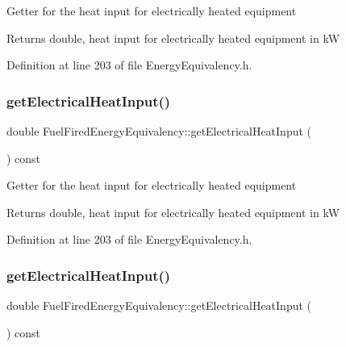 Getter for the heat input for electrically heated equipment

\begin{DoxyReturn}{Returns}
double, heat input for electrically heated equipment in kW 
\end{DoxyReturn}


Definition at line 203 of file Energy\+Equivalency.\+h.

\mbox{\label{class_fuel_fired_energy_equivalency_a7d5878809c01a9243aa999406cddd4a9}} 
\subsubsection{\texorpdfstring{get\+Electrical\+Heat\+Input()}{getElectricalHeatInput()}\hspace{0.1cm}{\footnotesize\ttfamily [2/3]}}
{\footnotesize\ttfamily double Fuel\+Fired\+Energy\+Equivalency\+::get\+Electrical\+Heat\+Input (\begin{DoxyParamCaption}{ }\end{DoxyParamCaption}) const\hspace{0.3cm}{\ttfamily [inline]}}

Getter for the heat input for electrically heated equipment

\begin{DoxyReturn}{Returns}
double, heat input for electrically heated equipment in kW 
\end{DoxyReturn}


Definition at line 203 of file Energy\+Equivalency.\+h.

\mbox{\label{class_fuel_fired_energy_equivalency_a7d5878809c01a9243aa999406cddd4a9}} 
\subsubsection{\texorpdfstring{get\+Electrical\+Heat\+Input()}{getElectricalHeatInput()}\hspace{0.1cm}{\footnotesize\ttfamily [3/3]}}
{\footnotesize\ttfamily double Fuel\+Fired\+Energy\+Equivalency\+::get\+Electrical\+Heat\+Input (\begin{DoxyParamCaption}{ }\end{DoxyParamCaption}) const\hspace{0.3cm}{\ttfamily [inline]}}

